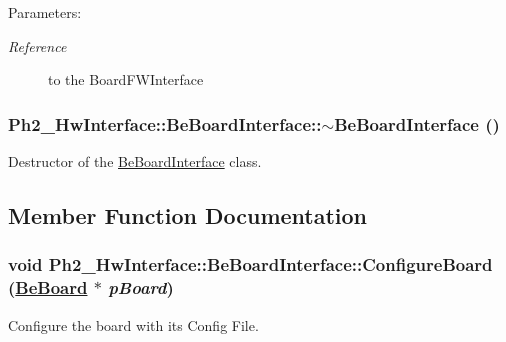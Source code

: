 \begin{Desc}
\item[Parameters:]
\begin{description}
\item[{\em Reference}]to the Board\-FWInterface \end{description}
\end{Desc}
\hypertarget{class_ph2___hw_interface_1_1_be_board_interface_d67b2d931b904565cf6e5881fa0d140e}{
\subsubsection[$\sim$BeBoardInterface]{\setlength{\rightskip}{0pt plus 5cm}Ph2\_\-Hw\-Interface::Be\-Board\-Interface::$\sim$Be\-Board\-Interface ()}}
\label{class_ph2___hw_interface_1_1_be_board_interface_d67b2d931b904565cf6e5881fa0d140e}


Destructor of the \hyperlink{class_ph2___hw_interface_1_1_be_board_interface}{Be\-Board\-Interface} class. 



\subsection{Member Function Documentation}
\hypertarget{class_ph2___hw_interface_1_1_be_board_interface_808eabcbd850dd651f9b3122f702079f}{
\subsubsection[ConfigureBoard]{\setlength{\rightskip}{0pt plus 5cm}void Ph2\_\-Hw\-Interface::Be\-Board\-Interface::Configure\-Board (\hyperlink{class_ph2___hw_description_1_1_be_board}{Be\-Board} $\ast$ {\em p\-Board})}}
\label{class_ph2___hw_interface_1_1_be_board_interface_808eabcbd850dd651f9b3122f702079f}


Configure the board with its Config File. 

